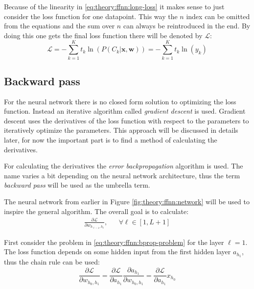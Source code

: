 Because of the linearity in \eqref{eq:theory:ffnn:long-loss} it makes sense to just consider the loss function for one datapoint. This way the $n$ index can be omitted from the equations and the sum over $n$ can always be reintroduced in the end. By doing this one gets the final loss function there will be denoted by $\mathcal{L}$:
\begin{equation}
\mathcal{L} = - \sum_{k=1}^K t_{k} \ln\left( P(C_{k} | \mathbf{x}, \mathbf{w})\right) =  - \sum_{k=1}^K t_k \ln(y_k)
\label{eq:theory:ffnn:loss}
\end{equation}

\subsection{Backward pass}

For the neural network there is no closed form solution to optimizing the loss function. Instead an iterative algorithm called \textit{gradient descent} is used. Gradient descent uses the derivatives of the loss function with respect to the parameters to iteratively optimize the parameters. This approach will be discussed in details later, for now the important part is to find a method of calculating the derivatives.

For calculating the derivatives the \textit{error backpropagation} algorithm is used. The name varies a bit depending on the neural network architecture, thus the term \textit{backward pass} will be used as the umbrella term.

The neural network from earlier in Figure \ref{fig:theory:ffnn:network} will be used to inspire the general algorithm. The overall goal is to calculate:
\begin{equation}
\begin{aligned}
\frac{\partial \mathcal{L}}{\partial w_{h_{\ell-1}, h_\ell}}, && \forall \ell \in [1, L + 1]
\end{aligned}
\label{eq:theory:ffnn:bprop-problem}
\end{equation} 

First consider the problem in \eqref{eq:theory:ffnn:bprop-problem} for the layer $\ell = 1$. The loss function depends on some hidden input from the first hidden layer $a_{h_1}$, thus the chain rule can be used:
\begin{equation}
\frac{\partial \mathcal{L}}{\partial w_{h_0, h_1}} = \frac{\partial \mathcal{L}}{\partial a_{h_1}} \frac{\partial a_{h_1}}{\partial w_{h_0, h_1}} =  \frac{\partial \mathcal{L}}{\partial a_{h_1}} x_{h_0}
\label{eq:theory:ffnn:bprop-firstlayer}
\end{equation}

